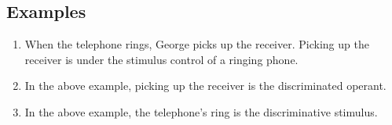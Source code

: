 \subsection{Examples}
\begin{enumerate}
\item When the telephone rings, George picks up the receiver.  Picking up the receiver is under the stimulus control of a ringing phone. 
\item In the above example, picking up the receiver is the discriminated operant. 
\item In the above example, the telephone's ring is the discriminative stimulus.
\end{enumerate}
